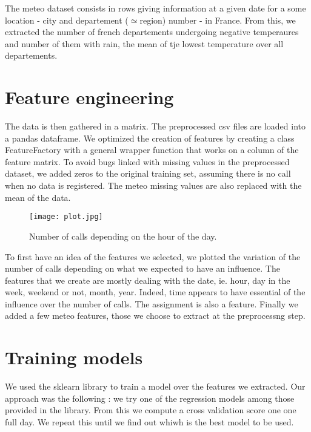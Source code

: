 \documentclass[english]{article}
\begin{document}
The meteo dataset consists in rows giving information at a given date
for a some location - city and departement ($\simeq$region) number
- in France. From this, we extracted the number of french departements
undergoing negative temperaures and number of them with rain, the
mean of tje lowest temperature over all departements.


\section{Feature engineering}

The data is then gathered in a matrix. The preprocessed csv files
are loaded into a pandas dataframe. We optimized the creation of features
by creating a class FeatureFactory with a general wrapper function
that works on a column of the feature matrix. To avoid bugs linked
with missing values in the preprocessed dataset, we added zeros to
the original training set, assuming there is no call when no data
is registered. The meteo missing values are also replaced with the
mean of the data.

\begin{figure}
\begin{centering}
\texttt{[image: plot.jpg]}
\end{centering}

\caption{Number of calls depending on the hour of the day.}


\end{figure}


To first have an idea of the features we selected, we plotted the
variation of the number of calls depending on what we expected to
have an influence. The features that we create are mostly dealing
with the date, ie. hour, day in the week, weekend or not, month, year.
Indeed, time appears to have essential of the influence over the number
of calls. The assignment is also a feature. Finally we added a few
meteo features, those we choose to extract at the preprocessng step.


\section{Training models}

We used the sklearn library to train a model over the features we
extracted. Our approach was the following : we try one of the regression
models among those provided in the library. From this we compute a
cross validation score one one full day. We repeat this until we find
out whiwh is the best model to be used. 
\end{document}
